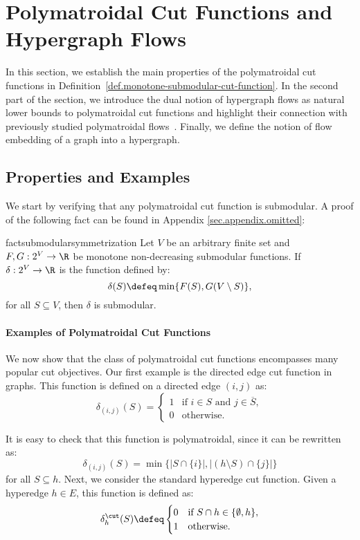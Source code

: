 \documentclass[letterpaper]{article}
\begin{document}
\section{Polymatroidal Cut Functions and Hypergraph Flows}
\label{sec.polymatroidal}

In this section, we establish the main properties of the polymatroidal cut functions in Definition~\ref{def.monotone-submodular-cut-function}. In the second part of the section, we introduce the dual notion of hypergraph flows as natural lower bounds to polymatroidal cut functions and highlight their connection with previously studied polymatroidal flows~\cite{chekuri2012multicommodity}. Finally, we define the notion of flow embedding of a graph into a hypergraph.

\subsection{Properties and Examples}\label{sec.properties.and.examples}

We start by verifying that any polymatroidal cut function is submodular. A proof of the following fact can be found in Appendix \ref{sec.appendix.omitted}:

\begin{restatable}{fact}{submodularsymmetrization}
\label{fact.submodular-symmetrization}
Let $V$ be an arbitrary finite set and $F,G:2^V \to \R$ be monotone non-decreasing submodular functions. If $\delta:2^V \to \R$ is the function defined by:
\[
    \delta(S) \defeq \min\{F(S),G(V \setminus S)\},
\]
for all $S \subseteq V$, then $\delta$ is submodular.
\end{restatable}

\paragraph{Examples of Polymatroidal Cut Functions} We now show that the class of polymatroidal cut functions encompasses many popular cut objectives. Our first example is the directed edge cut function in graphs. This function is defined on a directed edge $(i,j)$ as:
\[
    \delta_{(i,j)}(S) = \begin{cases}
        1 &\text{if } i\in S\text{ and }j
        \in \overline{S},\\
        0 &\text{otherwise}.
    \end{cases}
\]

It is easy to check that this function is polymatroidal, since it can be rewritten as:
\[
    \delta_{(i,j)}(S) = \min\{ |S \cap \{i\}|, |(h\setminus S) \cap \{j\}| \}
\]
for all $S \subseteq h$.
Next, we consider the standard hyperedge cut function. Given a hyperedge $h \in E$, this function is defined as:
\[
    \delta^\cut_h(S) \defeq \begin{cases}0 &\text{if }S\cap h \in \{\emptyset, h\},\\
    1 &\text{otherwise}.\end{cases}
\]
\end{document}

